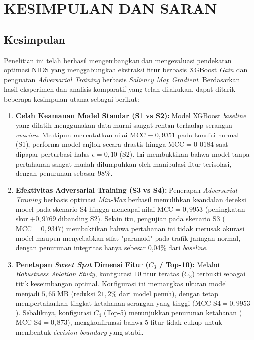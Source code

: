 \documentclass[11pt, a4paper]{article}
\begin{document}
\section{KESIMPULAN DAN SARAN}

\subsection{Kesimpulan}
Penelitian ini telah berhasil mengembangkan dan mengevaluasi pendekatan optimasi NIDS yang menggabungkan ekstraksi fitur berbasis XGBoost \textit{Gain} dan penguatan \textit{Adversarial Training} berbasis \textit{Saliency Map Gradient}. Berdasarkan hasil eksperimen dan analisis komparatif yang telah dilakukan, dapat ditarik beberapa kesimpulan utama sebagai berikut:

\begin{enumerate}
    \item \textbf{Celah Keamanan Model Standar (S1 vs S2):} Model XGBoost \textit{baseline} yang dilatih menggunakan data murni sangat rentan terhadap serangan \textit{evasion}. Meskipun mencatatkan nilai $\text{MCC} = 0{,}9351$ pada kondisi normal (S1), performa model anjlok secara drastis hingga $\text{MCC} = 0{,}0184$ saat dipapar perturbasi halus $\epsilon = 0{,}10$ (S2). Ini membuktikan bahwa model tanpa pertahanan sangat mudah dilumpuhkan oleh manipulasi fitur terisolasi, dengan penurunan sebesar 98\%.

    \item \textbf{Efektivitas Adversarial Training (S3 vs S4):} Penerapan \textit{Adversarial Training} berbasis optimasi \textit{Min-Max} berhasil memulihkan keandalan deteksi model pada skenario S4 hingga mencapai nilai $\text{MCC} = 0{,}9953$ (peningkatan skor $+0{,}9769$ dibanding S2). Selain itu, pengujian pada skenario S3 ($\text{MCC} = 0{,}9347$) membuktikan bahwa pertahanan ini tidak merusak akurasi model maupun menyebabkan sifat "paranoid" pada trafik jaringan normal, dengan penurunan integritas hanya sebesar 0,04\% dari \textit{baseline}.

    \item \textbf{Penetapan \textit{Sweet Spot} Dimensi Fitur ($C_3$ / Top-10):} Melalui \textit{Robustness Ablation Study}, konfigurasi $10$ fitur teratas ($C_3$) terbukti sebagai titik keseimbangan optimal. Konfigurasi ini memangkas ukuran model menjadi $5{,}65\text{ MB}$ (reduksi $21{,}2\%$ dari model penuh), dengan tetap mempertahankan tingkat ketahanan serangan yang tinggi ($\text{MCC S4} = 0{,}9953$). Sebaliknya, konfigurasi $C_4$ (Top-5) menunjukkan penurunan ketahanan ($\text{MCC S4} = 0{,}873$), mengkonfirmasi bahwa 5 fitur tidak cukup untuk membentuk \textit{decision boundary} yang stabil.


\end{enumerate}
\end{document}
